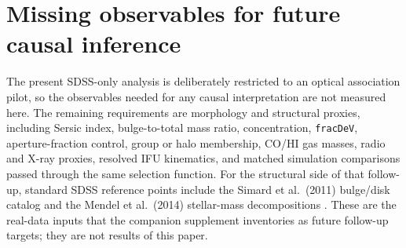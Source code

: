 \documentclass[twocolumn]{aastex631}
\begin{document}
\section{Missing observables for future causal inference}
The present SDSS-only analysis is deliberately restricted to an optical association pilot, so the observables needed for any causal interpretation are not measured here. The remaining requirements are morphology and structural proxies, including Sersic index, bulge-to-total mass ratio, concentration, \texttt{fracDeV}, aperture-fraction control, group or halo membership, CO/HI gas masses, radio and X-ray proxies, resolved IFU kinematics, and matched simulation comparisons passed through the same selection function. For the structural side of that follow-up, standard SDSS reference points include the Simard et al.\ (2011) bulge/disk catalog and the Mendel et al.\ (2014) stellar-mass decompositions \citep{simard2011,mendel2014}. These are the real-data inputs that the companion supplement inventories as future follow-up targets; they are not results of this paper.
\end{document}
